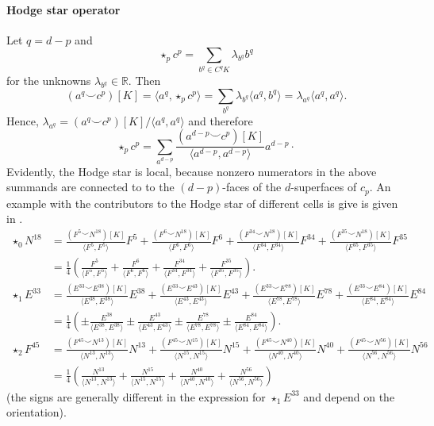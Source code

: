 \documentclass{elsarticle}
\theoremstyle{definition}
\newcommand{\R}{\mathbb{R}} %
\newcommand{\inner}[2]{\langle#1,#2\rangle}
\begin{document}
\paragraph{Hodge star operator}
Let $q = d - p$ and
\begin{equation*}
  \star_p c^p
    = \sum_{b^q \in C^q K} \lambda_{b^q} b^q
\end{equation*}
for the unknowns $\lambda_{b^q} \in \R$. Then
\begin{equation*}
  (a^q \smile c^p)[K]
    = \inner{a^q}{\star_{p} c^p} 
    = \sum_{b^q} \lambda_{b^q} \inner{a^q}{b^q} 
    = \lambda_{a^q} \inner{a^q}{a^q}.
\end{equation*}
Hence, $\lambda_{a^q} = (a^q \smile c^p)[K] / \inner{a^q} {a^q}$ and therefore
\begin{equation}
\label{eq:hodge_star}
  \star_p c^p 
    = \sum_{a^{d - p}} \frac{(a^{d - p} \smile c^p)[K]}{\inner{a^{d - p}} {a^{d - p}}} a^{d - p} \cdot
\end{equation}
Evidently, the Hodge star is local, because nonzero numerators in the above summands are connected to to the $(d - p)$-faces of the $d$-superfaces of $c_p$. An example with the contributors to the Hodge star of different cells is give is given in . 
\begin{align*}
  \star_0 N^{18} & =
      \frac{(F^5 \smile N^{18})[K]}{\inner{F^5}{F^5}} F^5
    + \frac{(F^6 \smile N^{18})[K]}{\inner{F^6}{F^6}} F^6
    + \frac{(F^{34} \smile N^{18})[K]}{\inner{F^{34}}{F^{34}}} F^{34}
    + \frac{(F^{35} \smile N^{18})[K]}{\inner{F^{35}}{F^{35}}} F^{35} \\
    & = \frac{1}{4} 
      \left( 
          \frac{F^5}{\inner{F^5}{F^5}}
        + \frac{F^6}{\inner{F^6}{F^6}}
        + \frac{F^{34}}{\inner{F^{34}}{F^{34}}}
        + \frac{F^{35}}{\inner{F^{35}}{F^{35}}}
      \right). \\
  \star_1 E^{33} & =
      \frac{(E^{33} \smile E^{38})[K]}{\inner{E^{38}}{E^{38}}} E^{38}
    + \frac{(E^{33} \smile E^{43})[K]}{\inner{E^{43}}{E^{43}}} E^{43}
    + \frac{(E^{33} \smile E^{78})[K]}{\inner{E^{78}}{E^{78}}} E^{78}
    + \frac{(E^{33} \smile E^{84})[K]}{\inner{E^{84}}{E^{84}}} E^{84} \\
    & = \frac{1}{4} 
      \left( 
        \pm \frac{E^{38}}{\inner{E^{38}}{E^{38}}}
        \pm \frac{E^{43}}{\inner{E^{43}}{E^{43}}}
        \pm \frac{E^{78}}{\inner{E^{78}}{E^{78}}}
        \pm \frac{E^{84}}{\inner{E^{84}}{E^{84}}}
      \right). \\
  \star_2 F^{45} & =
      \frac{(F^{45} \smile N^{13})[K]}{\inner{N^{13}}{N^{13}}} N^{13}
    + \frac{(F^{45} \smile N^{15})[K]}{\inner{N^{15}}{N^{15}}} N^{15}
    + \frac{(F^{45} \smile N^{40})[K]}{\inner{N^{40}}{N^{40}}} N^{40}
    + \frac{(F^{45} \smile N^{56})[K]}{\inner{N^{56}}{N^{56}}} N^{56} \\
    & = \frac{1}{4} 
      \left( 
          \frac{N^{13}}{\inner{N^{13}}{N^{13}}}
        + \frac{N^{15}}{\inner{N^{15}}{N^{15}}}
        + \frac{N^{40}}{\inner{N^{40}}{N^{40}}}
        + \frac{N^{56}}{\inner{N^{56}}{N^{56}}}
      \right)
\end{align*}
(the signs are generally different in the expression for $\star_1 E^{33}$ and depend on the orientation).
\end{document}
